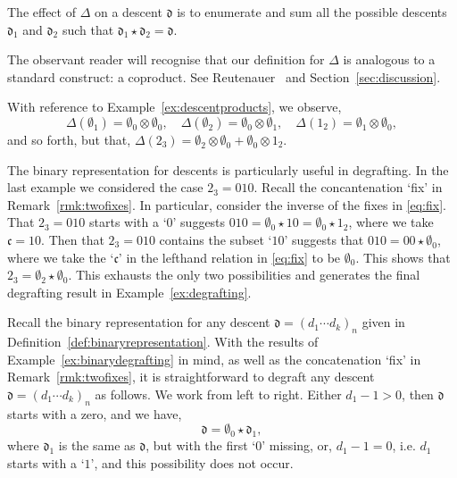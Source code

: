 \documentclass[5p,twocolumn]{elsarticle}
\newcommand*{\df}{\mathfrak d}
\begin{document}
%
The effect of $\Delta$ on a descent $\df$ is to enumerate and sum all the possible descents $\df_1$ and $\df_2$ such that $\df_1\star\df_2=\df$.
%
\begin{remark}
The observant reader will recognise that our definition for $\Delta$ is analogous to a standard construct: a coproduct. See Reutenauer~\cite{Reutenauer} and Section~\ref{sec:discussion}. 
\end{remark}
%
\begin{example}\label{ex:degrafting}
  With reference to Example~\ref{ex:descentproducts}, we observe,
  \begin{equation*}
    \Delta(\emptyset_1)=\emptyset_0\otimes\emptyset_0, \quad \Delta(\emptyset_2)=\emptyset_0\otimes\emptyset_1, \quad \Delta(1_2)=\emptyset_1\otimes\emptyset_0,
  \end{equation*}
  and so forth, but that, $\Delta(2_3)=\emptyset_2\otimes\emptyset_0+\emptyset_0\otimes1_2$.
\end{example}
%
\begin{example}\label{ex:binarydegrafting}
  The binary representation for descents is particularly useful in degrafting. In the last example we considered the case $2_3=010$.
  Recall the concantenation `fix' in Remark~\ref{rmk:twofixes}. In particular, consider the inverse of the fixes in \eqref{eq:fix}.
  That $2_3=010$ starts with a `$0$' suggests $010=\emptyset_0\star10=\emptyset_0\star1_2$, where we take $\mathfrak{c}=10$.
  Then that $2_3=010$ contains the subset `$10$' suggests that $010=00\star\emptyset_0$, where we take the `$\mathfrak{c}$' in the lefthand relation in \eqref{eq:fix} to be $\emptyset_0$.
  This shows that $2_3=\emptyset_2\star\emptyset_0$. This exhausts the only two possibilities and generates the final degrafting result in Example~\ref{ex:degrafting}.
\end{example}
%
Recall the binary representation for any descent $\df=(d_1\cdots d_k)_n$ given in Definition~\ref{def:binaryrepresentation}.
With the results of Example~\ref{ex:binarydegrafting} in mind, as well as the concatenation `fix' in Remark~\ref{rmk:twofixes},
it is straightforward to degraft any descent $\df=(d_1\cdots d_k)_n$ as follows. We work from left to right.
Either $d_1-1>0$, then $\df$ starts with a zero, and we have,
\begin{equation*}
     \df=\emptyset_0\star\df_1,
\end{equation*}
where $\df_1$ is the same as $\df$, but with the first `$0$' missing, or, $d_1-1=0$, i.e.\/ $d_1$ starts with a `$1$', and this possibility does not occur.
\end{document}
